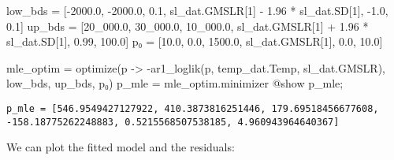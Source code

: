 \documentclass[
  letterpaper,
  DIV=11,
  numbers=noendperiod]{scrartcl}
\newenvironment{Shaded}{\begin{snugshade}}{\end{snugshade}}
\newcommand{\FloatTok}[1]{\textcolor[rgb]{0.68,0.00,0.00}{#1}}
\newcommand{\FunctionTok}[1]{\textcolor[rgb]{0.28,0.35,0.67}{#1}}
\newcommand{\NormalTok}[1]{\textcolor[rgb]{0.00,0.23,0.31}{#1}}
\newcommand{\OperatorTok}[1]{\textcolor[rgb]{0.37,0.37,0.37}{#1}}
\newcommand{\PreprocessorTok}[1]{\textcolor[rgb]{0.68,0.00,0.00}{#1}}
\begin{document}
\begin{Shaded}
\begin{Highlighting}[]
\NormalTok{low\_bds }\OperatorTok{=}\NormalTok{ [}\OperatorTok{{-}}\FloatTok{2000.0}\NormalTok{, }\OperatorTok{{-}}\FloatTok{2000.0}\NormalTok{, }\FloatTok{0.1}\NormalTok{, sl\_dat.GMSLR[}\FloatTok{1}\NormalTok{] }\OperatorTok{{-}} \FloatTok{1.96} \OperatorTok{*}\NormalTok{ sl\_dat.SD[}\FloatTok{1}\NormalTok{], }\OperatorTok{{-}}\FloatTok{1.0}\NormalTok{, }\FloatTok{0.1}\NormalTok{]}
\NormalTok{up\_bds }\OperatorTok{=}\NormalTok{ [}\FloatTok{20\_000.0}\NormalTok{, }\FloatTok{30\_000.0}\NormalTok{, }\FloatTok{10\_000.0}\NormalTok{, sl\_dat.GMSLR[}\FloatTok{1}\NormalTok{] }\OperatorTok{+} \FloatTok{1.96} \OperatorTok{*}\NormalTok{ sl\_dat.SD[}\FloatTok{1}\NormalTok{], }\FloatTok{0.99}\NormalTok{, }\FloatTok{100.0}\NormalTok{]}
\NormalTok{p₀ }\OperatorTok{=}\NormalTok{ [}\FloatTok{10.0}\NormalTok{, }\FloatTok{0.0}\NormalTok{, }\FloatTok{1500.0}\NormalTok{, sl\_dat.GMSLR[}\FloatTok{1}\NormalTok{], }\FloatTok{0.0}\NormalTok{, }\FloatTok{10.0}\NormalTok{]}

\NormalTok{mle\_optim }\OperatorTok{=} \FunctionTok{optimize}\NormalTok{(p }\OperatorTok{{-}\textgreater{}} \FunctionTok{{-}ar1\_loglik}\NormalTok{(p, temp\_dat.Temp, sl\_dat.GMSLR), low\_bds, up\_bds, p₀)}
\NormalTok{p\_mle }\OperatorTok{=}\NormalTok{ mle\_optim.minimizer}
\PreprocessorTok{@show}\NormalTok{ p\_mle;}
\end{Highlighting}
\end{Shaded}

\begin{verbatim}
p_mle = [546.9549427127922, 410.3873816251446, 179.69518456677608, -158.18775262248883, 0.5215568507538185, 4.960943964640367]
\end{verbatim}

We can plot the fitted model and the residuals:
\end{document}
